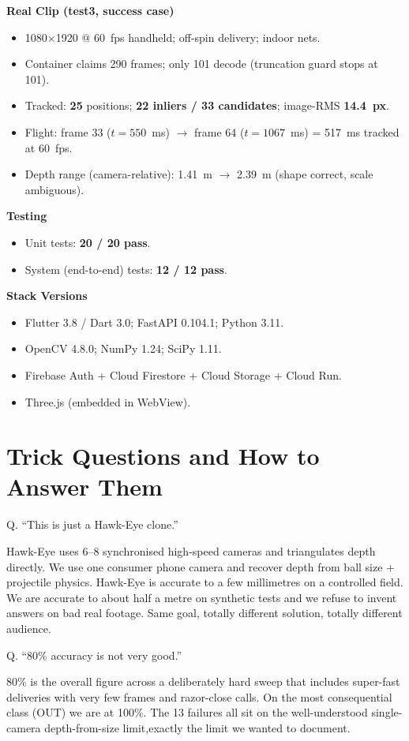\documentclass[11pt,a4paper]{article}
\newcommand{\qa}[2]{%
  \par\vspace{8pt}%
  \noindent
  \colorbox{NavyTint}{%
    \begin{minipage}{\dimexpr\textwidth-2\fboxsep\relax}%
      \color{white}\bfseries\strut Q. #1%
    \end{minipage}%
  }\par\nobreak
  \noindent
  \colorbox{MutedBg}{%
    \begin{minipage}{\dimexpr\textwidth-2\fboxsep\relax}%
      \color{black}\setlength{\parskip}{4pt}\strut #2\strut%
    \end{minipage}%
  }%
  \par\vspace{6pt}%
}
\begin{document}
{\textbf{Real Clip (test3, success case)}
\begin{itemize}
  \item 1080$\times$1920 @ 60~fps handheld; off-spin delivery; indoor nets.
  \item Container claims 290 frames; only 101 decode (truncation guard stops at 101).
  \item Tracked: \textbf{25} positions; \textbf{22 inliers / 33 candidates}; image-RMS \textbf{14.4~px}.
  \item Flight: frame 33 ($t=550$~ms) $\rightarrow$ frame 64 ($t=1067$~ms) = 517~ms tracked at 60~fps.
  \item Depth range (camera-relative): 1.41~m $\rightarrow$ 2.39~m (shape correct, scale ambiguous).
\end{itemize}

\textbf{Testing}
\begin{itemize}
  \item Unit tests: \textbf{20 / 20 pass}.
  \item System (end-to-end) tests: \textbf{12 / 12 pass}.
\end{itemize}

\textbf{Stack Versions}
\begin{itemize}
  \item Flutter 3.8 / Dart 3.0; FastAPI 0.104.1; Python 3.11.
  \item OpenCV 4.8.0; NumPy 1.24; SciPy 1.11.
  \item Firebase Auth + Cloud Firestore + Cloud Storage + Cloud Run.
  \item Three.js (embedded in WebView).
\end{itemize}
}

\section{Trick Questions and How to Answer Them}

\qa{``This is just a Hawk-Eye clone.''}{%
Hawk-Eye uses 6--8 synchronised high-speed cameras and triangulates depth directly. We use one consumer phone camera and recover depth from ball size + projectile physics. Hawk-Eye is accurate to a few millimetres on a controlled field. We are accurate to about half a metre on synthetic tests and we refuse to invent answers on bad real footage. Same goal, totally different solution, totally different audience.}

\qa{``80\% accuracy is not very good.''}{%
80\% is the overall figure across a deliberately hard sweep that includes super-fast deliveries with very few frames and razor-close calls. On the most consequential class (OUT) we are at 100\%. The 13 failures all sit on the well-understood single-camera depth-from-size limit,exactly the limit we wanted to document.}
\end{document}
